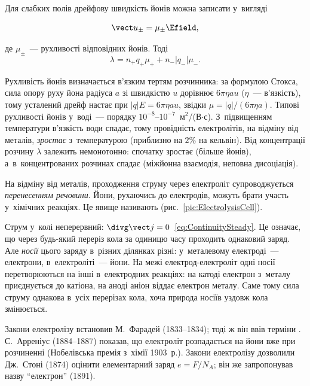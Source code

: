 Для слабких полів дрейфову швидкість йонів можна записати у~вигляді

\begin{equation*}
	\vect u_\pm = \mu_\pm \Efield,
\end{equation*}

де $\mu_\pm$~--- рухливості відповідних йонів. Тоді
\begin{equation}\label{eq:ElectrolyteConductivity}
	\lambda = n_+q_+\mu_+ + n_-|q_-|\mu_-.
\end{equation}

Рухливість йонів визначається в'язким тертям розчинника: за формулою Стокса, сила опору
руху йона радіуса $a$ зі швидкістю $u$ дорівнює $6\pi\eta a u$ ($\eta$~--- в'язкість),
тому усталений дрейф настає при $|q|E=6\pi\eta a u$, звідки $\mu=|q|/(6\pi\eta a)$. Типові
рухливості йонів у~воді~--- порядку $10^{-8}$--$10^{-7}$~м$^2$/(В$\cdot$с). З~підвищенням
температури в'язкість води спадає, тому провідність електролітів, на відміну від металів,
\emph{зростає} з~температурою (приблизно на $2\%$ на кельвін). Від концентрації розчину
$\lambda$ залежить немонотонно: спочатку зростає (більше йонів), а~в~концентрованих
розчинах спадає (міжйонна взаємодія, неповна дисоціація).

На відміну від металів, проходження струму через електроліт супроводжується
\emph{перенесенням речовини}. Йони, рухаючись до електродів, можуть брати участь
у~хімічних реакціях. Це явище називають 
(рис.~\ref{pic:ElectrolysisCell}).

Струм у~колі неперервний: $\divg\vect j=0$~\eqref{eq:ContinuitySteady}. Це означає, що
через будь-який переріз кола за одиницю часу проходить однаковий заряд. Але \emph{носії}
цього заряду в~різних ділянках різні: у~металевому електроді~--- електрони,
в~електроліті~--- йони. На межі електрод-електроліт одні носії перетворюються на інші
в~електродних реакціях: на катоді електрон з~металу приєднується до катіона, на аноді
аніон віддає електрон металу. Саме тому сила струму однакова в~усіх перерізах кола, хоча
природа носіїв уздовж кола змінюється.

\begin{Historical}
	Закони електролізу встановив М.~Фарадей (1833--1834); тоді ж він ввів терміни
	. С.~Арреніус (1884--1887) показав, що
	електроліт розпадається на йони вже при розчиненні (Нобелівська премія з~хімії
	1903~р.). Закони електролізу дозволили Дж.~Стоні (1874) оцінити елементарний заряд
	$e=F/N_A$; він же запропонував назву \enquote{електрон} (1891).
\end{Historical}

